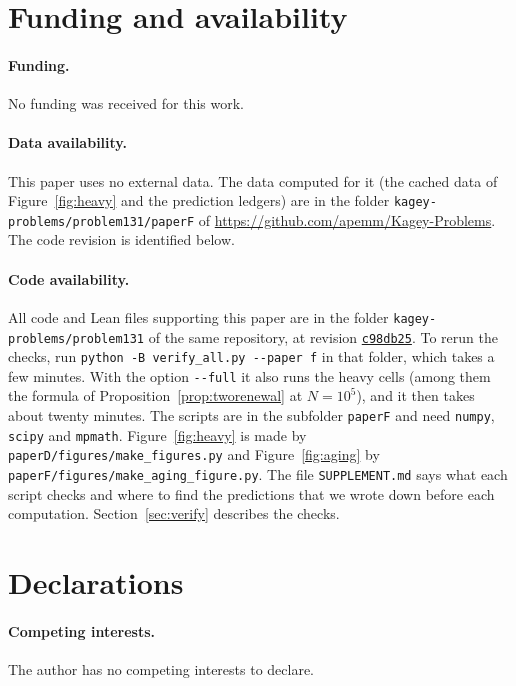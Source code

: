 \documentclass[11pt]{article}
\theoremstyle{definition}
\theoremstyle{remark}
\begin{document}
\appendix



\section*{Funding and availability}
\paragraph{Funding.} No funding was received for this work.

\paragraph{Data availability.} This paper uses no external data. The data
computed for it (the cached data of Figure~\ref{fig:heavy} and the
prediction ledgers) are in the folder \nolinkurl{kagey-problems/problem131/paperF}
of \url{https://github.com/apemm/Kagey-Problems}. The code revision is
identified below.

{\sloppy
\paragraph{Code availability.} All code and Lean files supporting this
paper are in the folder \nolinkurl{kagey-problems/problem131} of the same
repository, at revision
\href{https://github.com/apemm/Kagey-Problems/tree/c98db255026bf21ed3c041a8ed888ed99b734886}{\texttt{c98db25}}.
To rerun the checks, run
\texttt{python -B verify\_all.py -{}-paper f} in that folder, which takes
a few minutes. With the option \texttt{-{}-full} it also runs the heavy cells
(among them the formula of Proposition~\ref{prop:tworenewal} at $N=10^5$), and
it then takes about twenty minutes. The scripts are in the subfolder
\nolinkurl{paperF} and need \texttt{numpy}, \texttt{scipy} and \texttt{mpmath}.
Figure~\ref{fig:heavy} is made by \nolinkurl{paperD/figures/make_figures.py}
and Figure~\ref{fig:aging} by \nolinkurl{paperF/figures/make_aging_figure.py}.
The file \nolinkurl{SUPPLEMENT.md} says what each script checks and where to
find the predictions that we wrote down before each computation.
Section~\ref{sec:verify} describes the checks.
\par}

\section*{Declarations}
\paragraph{Competing interests.} The author has no competing interests to
declare.
\end{document}
